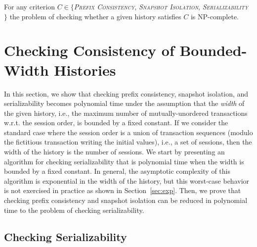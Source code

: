 \begin{theorem}
 \label{npcproof:0}
\hspace{-2mm}
For any criterion $C \in \{$\emph{\textsc{Prefix Consistency}}, \emph{\textsc{Snapshot Isolation}}, \emph{\textsc{Serializability}} $\}$
the problem of checking whether a given history satisfies $C$ 
is NP-complete.
\end{theorem}


\section{Checking Consistency of Bounded-Width Histories}\label{sec:bounded_width}


In this section, we show that checking prefix consistency, snapshot isolation, and serializability becomes polynomial time under the assumption that the \emph{width} of the given history, i.e., the maximum number of mutually-unordered transactions w.r.t. the session order, is bounded by a fixed constant. If we consider the standard case where the session order is a union of transaction sequences (modulo the fictitious transaction writing the initial values), i.e., a set of sessions, then the width of the history is the number of sessions. We start by presenting an algorithm for checking serializability that is polynomial time when the width is bounded by a fixed constant. In general, the asymptotic complexity of this algorithm is exponential in the width of the history, but this worst-case behavior is not exercised in practice as shown in Section~\ref{sec:exp}. Then, we prove that checking prefix consistency and snapshot isolation can be reduced in polynomial time to the problem of checking serializability. 

\subsection{Checking Serializability}\label{ssec:ser_checking}

